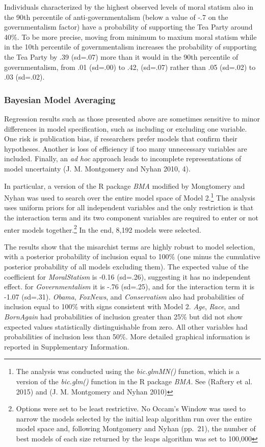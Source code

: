 \documentclass[12pt,]{article}
\let\rmarkdownfootnote\footnote%
\def\footnote{\protect\rmarkdownfootnote}
\begin{document}
Individuals characterized by the highest observed levels of moral
statism also in the 90th percentile of anti-governmentalism (below a
value of -.7 on the governmentalism factor) have a probability of
supporting the Tea Party around 40\%. To be more precise, moving from
minimum to maxium moral statism while in the 10th percentile of
governmentalism increases the probability of supporting the Tea Party by
.39 (sd=.07) more than it would in the 90th percentile of
governmentalism, from .01 (sd=.00) to .42, (sd=.07) rather than .05
(sd=.02) to .03 (sd=.02).

\clearpage

\subsubsection{Bayesian Model Averaging}\label{bayesian-model-averaging}

Regression results such as those presented above are sometimes sensitive
to minor differences in model specification, such as including or
excluding one variable. One risk is publication bias, if researchers
prefer models that confirm their hypotheses. Another is loss of
efficiency if too many unnecessary variables are included. Finally, an
\emph{ad hoc} approach leads to incomplete representations of model
uncertainty (J. M. Montgomery and Nyhan 2010, 4).

In particular, a version of the R package \emph{BMA} modified by
Mongtomery and Nyhan was used to search over the entire model space of
Model 2.\footnote{The analysis was conducted using the
  \emph{bic.glmMN()} function, which is a version of the
  \emph{bic.glm()} function in the R package \emph{BMA}. See (Raftery et
  al. 2015) and (J. M. Montgomery and Nyhan 2010)} The analysis uses
uniform priors for all independent variables and the only restriction is
that the interaction term and its two component variables are required
to enter or not enter models together.\footnote{Options were set to be
  least restrictive. No Occam's Window was used to narrow the models
  selected by the initial leap algorithm run over the entire model space
  and, following Montgomery and Nyhan (pp.~21), the number of best
  models of each size returned by the leaps algorithm was set to 100,000}
In the end, 8,192 models were selected.

The results show that the misarchist terms are highly robust to model
selection, with a posterior probability of inclusion equal to 100\% (one
minus the cumulative posterior probability of all models excluding
them). The expected value of the coefficient for \emph{MoralStatism} is
-0.16 (sd=.26), suggesting it has no independent effect. for
\emph{Governmentalism} it is -.76 (sd=.25), and for the interaction term
it is -1.07 (sd=.31). \emph{Obama}, \emph{FoxNews}, and
\emph{Conservatism} also had probabilities of inclusion equal to 100\%
with signs consistent with Model 2. \emph{Age}, \emph{Race}, and
\emph{BornAgain} had probabilities of inclusion greater than 25\% but
did not show expected values statistically distinguishable from zero.
All other variables had probabilities of inclusion less than 50\%. More
detailed graphical information is reported in Supplementary Information.
\end{document}
